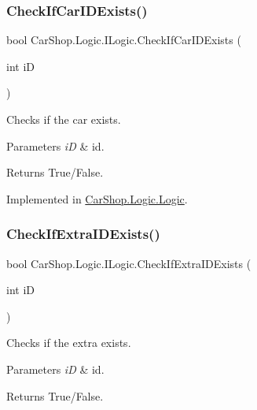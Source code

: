 \subsubsection{\texorpdfstring{Check\+If\+Car\+I\+D\+Exists()}{CheckIfCarIDExists()}}
{\footnotesize\ttfamily bool Car\+Shop.\+Logic.\+I\+Logic.\+Check\+If\+Car\+I\+D\+Exists (\begin{DoxyParamCaption}\item[{int}]{iD }\end{DoxyParamCaption})}



Checks if the car exists. 


\begin{DoxyParams}{Parameters}
{\em iD} & id.\\
\hline
\end{DoxyParams}
\begin{DoxyReturn}{Returns}
True/\+False.
\end{DoxyReturn}


Implemented in \mbox{\hyperlink{class_car_shop_1_1_logic_1_1_logic_aa1e3ab411c53e0498145f1f77cb33766}{Car\+Shop.\+Logic.\+Logic}}.

\mbox{\label{interface_car_shop_1_1_logic_1_1_i_logic_a86f7d6d049a74365b7bc3e135f11a539}} 
\subsubsection{\texorpdfstring{Check\+If\+Extra\+I\+D\+Exists()}{CheckIfExtraIDExists()}}
{\footnotesize\ttfamily bool Car\+Shop.\+Logic.\+I\+Logic.\+Check\+If\+Extra\+I\+D\+Exists (\begin{DoxyParamCaption}\item[{int}]{iD }\end{DoxyParamCaption})}



Checks if the extra exists. 


\begin{DoxyParams}{Parameters}
{\em iD} & id.\\
\hline
\end{DoxyParams}
\begin{DoxyReturn}{Returns}
True/\+False.
\end{DoxyReturn}


